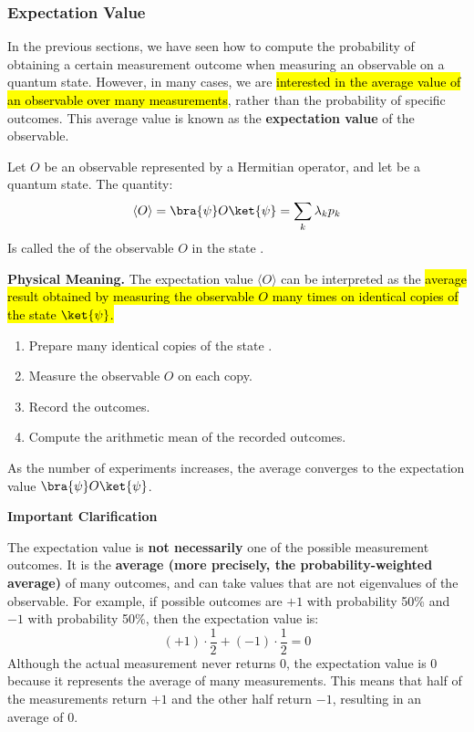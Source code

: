 \subsubsection{Expectation Value}\label{sec:expectation-value}

In the previous sections, we have seen how to compute the probability of obtaining a certain measurement outcome when measuring an observable on a quantum state. However, in many cases, we are \hl{interested in the average value of an observable over many measurements}, rather than the probability of specific outcomes. This average value is known as the \textbf{expectation value} of the observable.

\highspace
\begin{definitionbox}
    Let $O$ be an observable represented by a Hermitian operator, and let \ket{\psi} be a quantum state. The quantity:
    \begin{equation}\label{eq:expectation-value}
        \langle O \rangle = \bra{\psi} O \ket{\psi} = \sum_k \lambda_k p_k
    \end{equation}
    Is called the  of the observable $O$ in the state \ket{\psi}.
\end{definitionbox}

\highspace
\textcolor{Green3}{ \textbf{Physical Meaning.}} The expectation value $\langle O \rangle$ can be interpreted as the \hl{average result obtained by measuring the observable $O$ many times on identical copies of the state $\ket{\psi}$.}
\begin{enumerate}
    \item Prepare many identical copies of the state \ket{\psi}.
    \item Measure the observable $O$ on each copy.
    \item Record the outcomes.
    \item Compute the arithmetic mean of the recorded outcomes.
\end{enumerate}
As the number of experiments increases, the average converges to the expectation value $\bra{\psi} O \ket{\psi}$.

\highspace
\begin{flushleft}
    \textcolor{Red2}{ \textbf{Important Clarification}}
\end{flushleft}
The expectation value is \textbf{not necessarily} one of the possible measurement outcomes. It is the \textbf{average (more precisely, the probability-weighted average)} of many outcomes, and can take values that are not eigenvalues of the observable. For example, if possible outcomes are $+1$ with probability 50\% and $-1$ with probability 50\%, then the expectation value is:
\begin{equation*}
    \left(+1\right) \cdot \frac{1}{2} + \left(-1\right) \cdot \frac{1}{2} = 0
\end{equation*}
Although the actual measurement never returns $0$, the expectation value is $0$ because it represents the average of many measurements. This means that half of the measurements return $+1$ and the other half return $-1$, resulting in an average of $0$.

